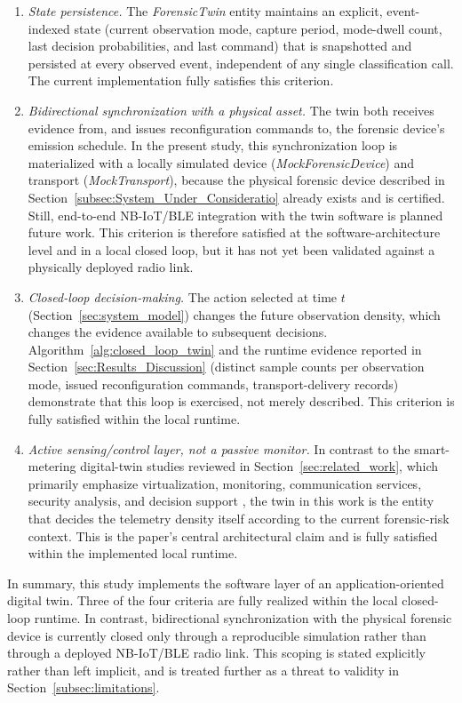 \documentclass{ieeeaccess}
\begin{document}
\begin{enumerate}
    \item \textit{State persistence.} The \textit{ForensicTwin} entity maintains an explicit, event-indexed state (current observation mode, capture period, mode-dwell count, last decision probabilities, and last command) that is snapshotted and persisted at every observed event, independent of any single classification call. The current implementation fully satisfies this criterion.
    \item \textit{Bidirectional synchronization with a physical asset.} The twin both receives evidence from, and issues reconfiguration commands to, the forensic device's emission schedule. In the present study, this synchronization loop is materialized with a locally simulated device (\textit{MockForensicDevice}) and transport (\textit{MockTransport}), because the physical forensic device described in Section~\ref{subsec:System_Under_Consideratio} already exists and is certified. Still, end-to-end NB-IoT/BLE integration with the twin software is planned future work. This criterion is therefore satisfied at the software-architecture level and in a local closed loop, but it has not yet been validated against a physically deployed radio link.
    \item \textit{Closed-loop decision-making.} The action selected at time $t$ (Section~\ref{sec:system_model}) changes the future observation density, which changes the evidence available to subsequent decisions. Algorithm~\ref{alg:closed_loop_twin} and the runtime evidence reported in Section~\ref{sec:Results_Discussion} (distinct sample counts per observation mode, issued reconfiguration commands, transport-delivery records) demonstrate that this loop is exercised, not merely described. This criterion is fully satisfied within the local runtime.
    \item \textit{Active sensing/control layer, not a passive monitor.} In contrast to the smart-metering digital-twin studies reviewed in Section~\ref{sec:related_work}, which primarily emphasize virtualization, monitoring, communication services, security analysis, and decision support \cite{b18,b20,b22,b39,b40}, the twin in this work is the entity that decides the telemetry density itself according to the current forensic-risk context. This is the paper's central architectural claim and is fully satisfied within the implemented local runtime.
\end{enumerate}

In summary, this study implements the software layer of an application-oriented digital twin. Three of the four criteria are fully realized within the local closed-loop runtime. In contrast, bidirectional synchronization with the physical forensic device is currently closed only through a reproducible simulation rather than through a deployed NB-IoT/BLE radio link. This scoping is stated explicitly rather than left implicit, and is treated further as a threat to validity in Section~\ref{subsec:limitations}.
\end{document}
